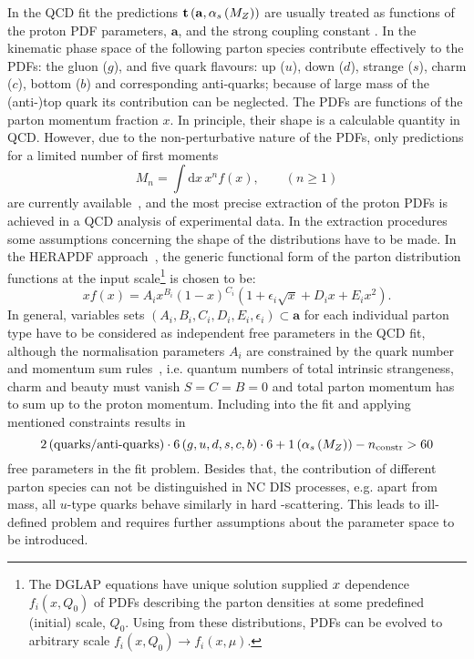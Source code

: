 In the QCD fit the predictions $\mathbf{t}\left( \mathbf{a},\mbox{$\alpha_{s}\left(M_{Z}\right)$}\right)$ are usually treated as functions of the proton PDF parameters, $\mathbf{a}$, and the strong coupling constant \asz. In the kinematic phase space of \hera the following parton species contribute effectively to the PDFs: the gluon ($g$), and five quark flavours: up ($u$), down ($d$), strange ($s$), charm ($c$), bottom ($b$) and corresponding anti-quarks; because of large mass of the (anti-)top quark its contribution can be neglected. The PDFs are functions of the parton momentum fraction $x$. In principle, their shape is a calculable quantity in QCD. However, due to the non-perturbative nature of the PDFs, only predictions for a limited number of first moments 
\begin{equation}
 M_n=\int\mathrm{d}x\,x^n f\left(x\right), \qquad (n\ge1)
\end{equation}
are currently available~\cite{Hagler:2009ni}, and the most precise extraction of the proton PDFs is achieved in a QCD analysis of experimental data. In the extraction procedures some assumptions concerning the shape of the distributions have to be made. In the HERAPDF approach~\cite{Aaron:2009aa}, the generic functional form of the parton distribution functions at the input scale\footnote{The DGLAP equations have unique solution supplied $\mbox{${x}$}$ dependence $f_i\left(x,Q_0\right)$ of PDFs describing the parton densities at some predefined (initial) scale, $Q_0$. Using from these distributions, PDFs can be evolved to arbitrary scale $f_i\left(x,Q_0\right) \rightarrow f_i\left(x,\mu\right)$.} is chosen to be:
\begin{equation}
 xf\left(x\right) = A_ix^{B_i}\left(1-x\right)^{C_i}\left(1+\epsilon_i\sqrt{x}+D_ix+E_ix^2\right).
 \label{eq:pdfansatz}
\end{equation}
In general, variables sets $\left(A_i,B_i,C_i,D_i,E_i,\epsilon_i\right)\subset\mathbf{a}$ for each individual parton type have to be considered as independent free parameters in the QCD fit, although the normalisation parameters $A_i$ are constrained by the quark number and momentum sum rules~\cite{Yndurain:2006lfa}, i.e. quantum numbers of total intrinsic strangeness, charm and beauty must vanish $S=C=B=0$ and total parton momentum has to sum up to the proton momentum. Including \asz into the fit and applying mentioned constraints results in 
\begin{equation}
2 \left( \text{quarks/anti-quarks}\right)\cdot 6\left(g,u,d,s,c,b\right)\cdot 6 + 1\left(\mbox{$\alpha_{s}\left(M_{Z}\right)$}\right) - n_\text{constr} > 60
\end{equation}
free parameters in the fit problem. Besides that, the contribution of different parton species can not be distinguished in NC DIS processes, e.g. apart from mass, all $u$-type quarks behave similarly in hard \ep-scattering. 
This leads to ill-defined problem and requires further assumptions about the parameter space to be introduced. 

